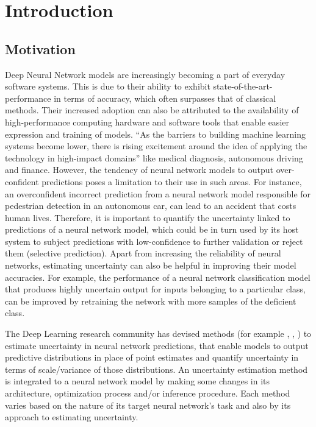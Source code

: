 

    \chapter{Introduction}
    \section{Motivation}
	Deep Neural Network models are increasingly becoming a part of everyday software systems. This is due to their ability to exhibit state-of-the-art-performance in terms of accuracy, which often surpasses that of classical methods. Their increased adoption can also be attributed to the availability of high-performance computing hardware and software tools that enable easier expression and training of models. \enquote{As the barriers to building machine learning systems become lower, there is rising excitement around the idea of applying the technology in high-impact domains} \cite{schulam2019can} like medical diagnosis, autonomous driving and finance. However, the tendency of neural network models to output over-confident predictions \cite{lakshminarayanan2017simple} poses a limitation to their use in such areas. For instance, an overconfident incorrect prediction from a neural network model responsible for pedestrian detection in an autonomous car, can lead to an accident that costs human lives. Therefore, it is important to quantify the uncertainty linked  to predictions of a neural network model, which could be in turn used by its host system to subject predictions with low-confidence to further validation or reject them (selective prediction). Apart from increasing the reliability of neural networks, estimating uncertainty can also be helpful in improving their model accuracies. For example, the performance of a neural network classification model that produces highly uncertain output for inputs belonging to a particular class, can be improved by retraining the network with more samples of the deficient class. \cite{settles2012active} \cite{yang2016active}


	The Deep Learning research community has devised methods (for example \cite{amini2020deep}, \cite{gal2016dropout}, \cite{lakshminarayanan2017simple}) to estimate uncertainty in neural network predictions, that enable models to output predictive distributions in place of point estimates and quantify uncertainty in terms of scale/variance of those distributions. An uncertainty estimation method is integrated to a neural network model by making some changes in its architecture, optimization process and/or inference procedure. Each method varies based on the nature of its target neural network's task and also by its approach to estimating uncertainty.


